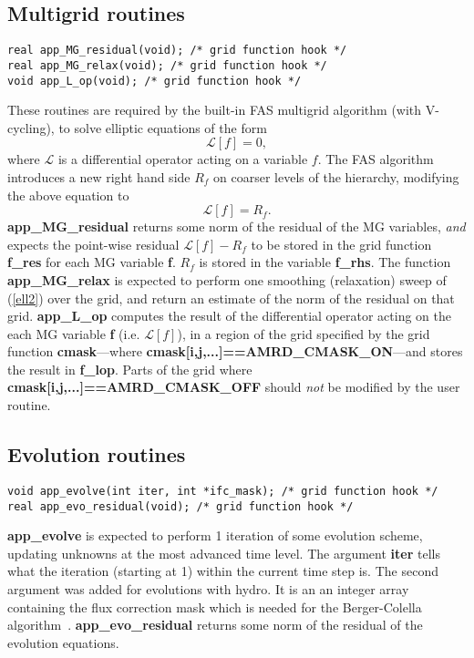 \documentclass[aps,amssymb,unsortedaddress,nofootinbib]{revtex4}
\begin{document}
\subsection{Multigrid routines} \label{sec_MG_routines}

\begin{verbatim}
real app_MG_residual(void); /* grid function hook */
real app_MG_relax(void); /* grid function hook */
void app_L_op(void); /* grid function hook */
\end{verbatim}

These routines are required by the built-in FAS multigrid algorithm (with V-cycling),
to solve elliptic equations of the form 
\begin{equation}
\mathcal{L} [f] = 0,
\end{equation}
where $\mathcal{L}$ is a differential operator acting on a variable $f$. The
FAS algorithm introduces a new right hand side $R_f$ on coarser levels
of the hierarchy, modifying the above equation to
\begin{equation}\label{ell2}
\mathcal{L} [f] = R_f.
\end{equation}
{\bf app\_MG\_residual} returns some norm of the residual of the MG variables,
{\em and} expects the point-wise residual $\mathcal{L} [f]-R_f$ to be stored in the grid function
{\bf f\_res} for each MG variable {\bf f}. $R_f$ is stored in the variable {\bf f\_rhs}. The function
{\bf app\_MG\_relax} is expected to perform one smoothing
(relaxation) sweep of (\ref{ell2}) over the grid, and return an estimate of the norm of the 
residual on that grid. 
{\bf app\_L\_op} computes the result of the differential operator
acting on the each MG variable {\bf f} (i.e. $\mathcal{L} [f]$),
in a region of the grid specified by the grid function {\bf cmask}---where 
{\bf cmask[i,j,...]==AMRD\_CMASK\_ON}---and stores the result in {\bf f\_lop}.
Parts of the grid where {\bf cmask[i,j,...]==AMRD\_CMASK\_OFF} should {\em not}
be modified by the user routine.

\subsection{Evolution routines}

\begin{verbatim}
void app_evolve(int iter, int *ifc_mask); /* grid function hook */
real app_evo_residual(void); /* grid function hook */
\end{verbatim}

{\bf app\_evolve} is expected to perform 1 iteration of some evolution scheme,
updating unknowns at the most advanced time level. The argument {\bf iter} 
tells what the iteration (starting at 1) within the current time step is.
The second argument was added for evolutions with hydro.  It is an
an integer array containing the flux correction mask which
is needed for the Berger-Colella algorithm~\cite{berger-colella}.  
{\bf app\_evo\_residual} returns some norm of the residual of the evolution
equations.
\end{document}
